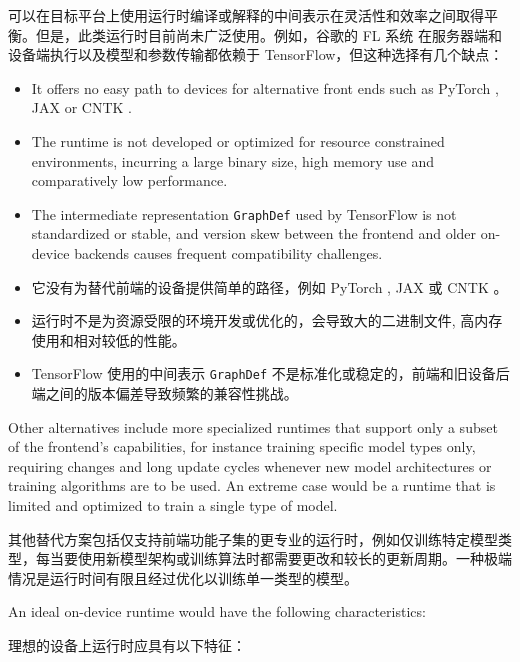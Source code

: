可以在目标平台上使用运行时编译或解释的中间表示在灵活性和效率之间取得平衡。但是，此类运行时目前尚未广泛使用。例如，谷歌的 FL 系统 \citep{bonawitz19sysml} 在服务器端和设备端执行以及模型和参数传输都依赖于 TensorFlow，但这种选择有几个缺点：

\begin{itemize}
    \item It offers no easy path to devices for alternative front ends such as PyTorch \citep{pytorch_NEURIPS2019_9015}, JAX \citep{jax2018github} or CNTK \citep{cntk}.
    \item The runtime is not developed or optimized for resource constrained environments, incurring a large binary size, high memory use and comparatively low performance.
    \item The intermediate representation \texttt{GraphDef} used by TensorFlow is not standardized or stable, and version skew between the frontend and older on-device backends causes frequent compatibility challenges.
    \item 它没有为替代前端的设备提供简单的路径，例如 PyTorch \citep{pytorch_NEURIPS2019_9015}, JAX \citep{jax2018github} 或 CNTK \citep{cntk}。
    \item 运行时不是为资源受限的环境开发或优化的，会导致大的二进制文件, 高内存使用和相对较低的性能。
    \item TensorFlow 使用的中间表示 \texttt{GraphDef} 不是标准化或稳定的，前端和旧设备后端之间的版本偏差导致频繁的兼容性挑战。
\end{itemize}

Other alternatives include more specialized runtimes that support only a subset of the frontend’s capabilities, for instance training specific model types only, requiring changes and long update cycles whenever new model architectures or training algorithms are to be used. An extreme case would be a runtime that is limited and optimized to train a single type of model.

其他替代方案包括仅支持前端功能子集的更专业的运行时，例如仅训练特定模型类型，每当要使用新模型架构或训练算法时都需要更改和较长的更新周期。一种极端情况是运行时间有限且经过优化以训练单一类型的模型。

An ideal on-device runtime would have the following characteristics:

理想的设备上运行时应具有以下特征：

